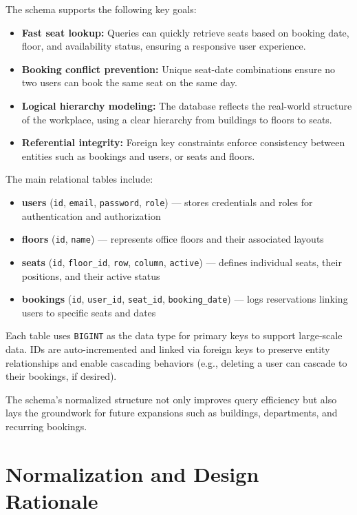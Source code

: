 \documentclass[12pt,a4paper]{report}
\begin{document}
The schema supports the following key goals:
\begin{itemize}
    \item \textbf{Fast seat lookup:} Queries can quickly retrieve seats based on booking date, floor, and availability status, ensuring a responsive user experience.
    \item \textbf{Booking conflict prevention:} Unique seat-date combinations ensure no two users can book the same seat on the same day.
    \item \textbf{Logical hierarchy modeling:} The database reflects the real-world structure of the workplace, using a clear hierarchy from buildings to floors to seats.
    \item \textbf{Referential integrity:} Foreign key constraints enforce consistency between entities such as bookings and users, or seats and floors.
\end{itemize}

The main relational tables include:

\begin{itemize}
    \item \textbf{users} (\texttt{id}, \texttt{email}, \texttt{password}, \texttt{role}) — stores credentials and roles for authentication and authorization
    \item \textbf{floors} (\texttt{id}, \texttt{name}) — represents office floors and their associated layouts
    \item \textbf{seats} (\texttt{id}, \texttt{floor\_id}, \texttt{row}, \texttt{column}, \texttt{active}) — defines individual seats, their positions, and their active status
    \item \textbf{bookings} (\texttt{id}, \texttt{user\_id}, \texttt{seat\_id}, \texttt{booking\_date}) — logs reservations linking users to specific seats and dates
\end{itemize}

Each table uses \texttt{BIGINT} as the data type for primary keys to support large-scale data. IDs are auto-incremented and linked via foreign keys to preserve entity relationships and enable cascading behaviors (e.g., deleting a user can cascade to their bookings, if desired).

The schema's normalized structure not only improves query efficiency but also lays the groundwork for future expansions such as buildings, departments, and recurring bookings.

\section{Normalization and Design Rationale}
\end{document}
